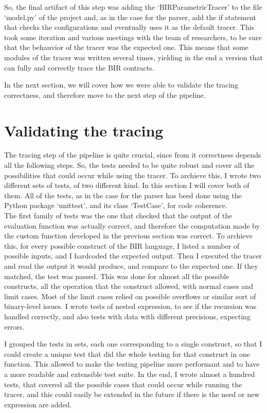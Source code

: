 So, the final artifact of this step was adding the `BIRParametricTracer' to the
file `model.py' of the project and, as in the case for the parser, add the if
statement that checks the configurations and eventually uses it as the default
tracer. This took some iteration and various meetings with the team of researchers,
to be sure that the behauvior of the tracer was the expected one. This means that
some modules of the tracer was written several times, yielding in the end a
version that can fully and correctly trace the BIR contracts.

In the next section, we will cover how we were able to validate the tracing correctness,
and therefore move to the next step of the pipeline.

\section{Validating the tracing}
\label{cha:Validating the tracing} The tracing step of the pipeline is quite
crucial, since from it correctness depends all the following steps. So, the tests
needed to be quite robust and cover all the possibilities that could occur while
using the tracer. To archieve this, I wrote two different sets of tests, of two
different kind. In this section I will cover both of them. All of the tests, as in
the case for the parser has beed done using the Python package `unittest', and
its class `TestCase', for code coherence. \\

The first family of tests was the one that checked that the output of the evaluation
function was actually correct, and therefore the computation made by the custom
function developed in the previous section was correct. To archieve this, for
every possible construct of the BIR language, I listed a number of possible inputs,
and I hardcoded the expected output. Then I executed the tracer and read the output
it would produce, and compare to the expected one. If they matched, the test was
passed. This was done for almost all the possible constructs, all the operation
that the construct allowed, with normal cases and limit cases. Most of the limit
cases relied on possible overflows or similar sort of binary-level issues. I wrote
tests of nested expression, to see if the recursion was handled correctly, and also
tests with data with different precisions, expecting errors.

I grouped the tests in sets, each one corresponding to a single construct, so
that I could create a unique test that did the whole testing for that construct
in one function. This allowed to make the testing pipeline more performant and to
have a more readable and extensible test suite. In the end, I wrote almost a hundred
tests, that covered all the possible cases that could occur while running the
tracer, and this could easily be extended in the future if there is the need or new
expression are added. \\


